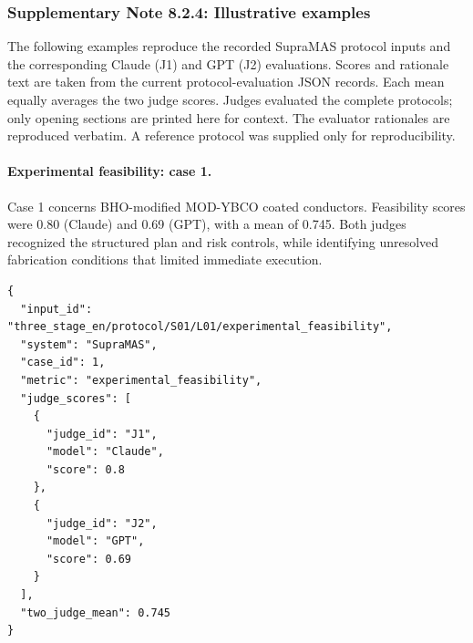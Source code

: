 \subsubsection*{Supplementary Note 8.2.4: Illustrative examples}
{}
The following examples reproduce the recorded SupraMAS protocol inputs and the corresponding Claude (J1) and GPT (J2) evaluations. Scores and rationale text are taken from the current protocol-evaluation JSON records. Each mean equally averages the two judge scores. Judges evaluated the complete protocols; only opening sections are printed here for context. The evaluator rationales are reproduced verbatim. A reference protocol was supplied only for reproducibility.

\paragraph*{Experimental feasibility: case 1.}
Case 1 concerns BHO-modified MOD-YBCO coated conductors. Feasibility scores were 0.80 (Claude) and 0.69 (GPT), with a mean of 0.745. Both judges recognized the structured plan and risk controls, while identifying unresolved fabrication conditions that limited immediate execution.

\begin{lstlisting}[style=jsonstyle,basicstyle=\fontsize{8}{9.6}\selectfont\ttfamily,backgroundcolor=\color{white}]
{
  "input_id": "three_stage_en/protocol/S01/L01/experimental_feasibility",
  "system": "SupraMAS",
  "case_id": 1,
  "metric": "experimental_feasibility",
  "judge_scores": [
    {
      "judge_id": "J1",
      "model": "Claude",
      "score": 0.8
    },
    {
      "judge_id": "J2",
      "model": "GPT",
      "score": 0.69
    }
  ],
  "two_judge_mean": 0.745
}
\end{lstlisting}

